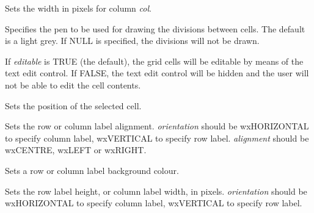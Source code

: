 \label{wxgridsetcolumnwidth}


Sets the width in pixels for column {\it col}.

\label{wxgridsetdividerpen}


Specifies the pen to be used for drawing the divisions between cells. The default
is a light grey. If NULL is specified, the divisions will not be drawn.

\label{wxgridseteditable}


If {\it editable} is TRUE (the default), the grid cells will be editable by means of the
text edit control. If FALSE, the text edit control will be hidden and the user will not
be able to edit the cell contents.

\label{wxgridsetgridcursor}


Sets the position of the selected cell.

\label{wxgridsetlabelalignment}


Sets the row or column label alignment. {\it orientation} should
be wxHORIZONTAL to specify column label, wxVERTICAL to specify row label.\rtfsp
{\it alignment} should be wxCENTRE, wxLEFT or wxRIGHT.

\label{wxgridsetlabelbackgroundcolour}


Sets a row or column label background colour.

\label{wxgridsetlabelsize}


Sets the row label height, or column label width, in pixels. {\it orientation} should
be wxHORIZONTAL to specify column label, wxVERTICAL to specify row label.

